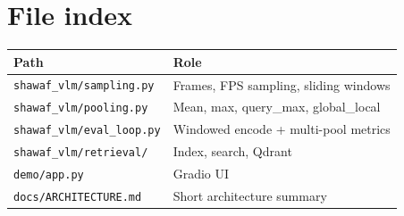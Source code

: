 \documentclass[11pt,a4paper]{article}
\begin{document}
\section{File index}
\begin{tabular}{@{}ll@{}}
\toprule
Path & Role \\
\midrule
\texttt{shawaf\_vlm/sampling.py} & Frames, FPS sampling, sliding windows \\
\texttt{shawaf\_vlm/pooling.py} & Mean, max, query\_max, global\_local \\
\texttt{shawaf\_vlm/eval\_loop.py} & Windowed encode + multi-pool metrics \\
\texttt{shawaf\_vlm/retrieval/} & Index, search, Qdrant \\
\texttt{demo/app.py} & Gradio UI \\
\texttt{docs/ARCHITECTURE.md} & Short architecture summary \\
\bottomrule
\end{tabular}
\end{document}
